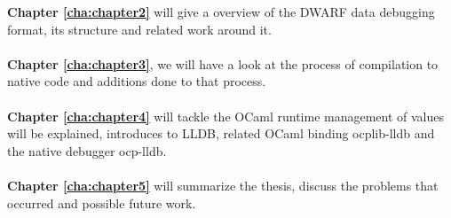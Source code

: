 \textbf{Chapter \ref{cha:chapter2}} will give a overview of the DWARF
data debugging format, its structure and related work around it.
\\
\\
\textbf{Chapter \ref{cha:chapter3}}, we will have a look at the process of
compilation to native code and additions done to that process.
\\
\\
\textbf{Chapter \ref{cha:chapter4}} will tackle the OCaml runtime management of
values will be explained, introduces to LLDB, related OCaml binding ocplib-lldb and
the native debugger ocp-lldb.
\\
\\
\textbf{Chapter \ref{cha:chapter5}} will summarize the thesis,
discuss the problems that occurred and possible future work.
